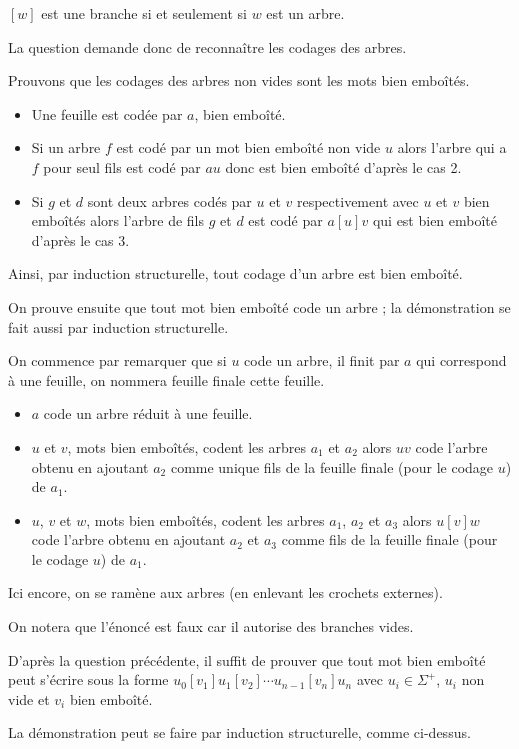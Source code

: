 \begin{Exercise}$[w]$ est une branche si et seulement si $w$ est un arbre.

La question demande donc de reconnaître les codages des arbres.

Prouvons que les codages des arbres non vides sont les mots bien emboîtés.

\begin{itemize}
    \item Une feuille est codée par $a$, bien emboîté.
    \item Si un arbre $f$ est codé par un mot bien emboîté non vide $u$ alors l'arbre qui a $f$ pour seul fils est codé par $au$ donc est bien emboîté d'après le cas 2.
    \item Si $g$ et $d$ sont deux arbres codés par $u$ et $v$ respectivement avec $u$ et $v$ bien emboîtés alors l'arbre de fils $g$ et $d$ est codé par $a[u]v$ qui est bien emboîté d'après le cas 3.
\end{itemize}

Ainsi, par induction structurelle, tout codage d'un arbre est bien emboîté.

\medskip

On prouve ensuite que tout mot bien emboîté code un arbre ; la démonstration se fait aussi par induction structurelle.

On commence par remarquer que si $u$ code un arbre, il finit par $a$ qui correspond à une feuille, on nommera feuille finale cette feuille.

\begin{itemize}
    \item $a$ code un arbre réduit à une feuille.
    \item $u$ et $v$, mots bien emboîtés, codent les arbres $a_1$ et $a_2$ alors $uv$ code l'arbre obtenu en ajoutant $a_2$ comme unique fils de la feuille finale (pour le codage $u$) de $a_1$.
    \item $u$, $v$ et $w$, mots bien emboîtés, codent les arbres $a_1$, $a_2$ et $a_3$ alors $u[v]w$ code l'arbre obtenu en ajoutant $a_2$ et $a_3$ comme fils de la feuille finale (pour le codage $u$) de $a_1$.
\end{itemize}
\end{Exercise}
\begin{Exercise}Ici encore, on se ramène aux arbres (en enlevant les crochets externes).

On notera que l'énoncé est faux car il autorise des branches vides.

D'après la question précédente, il suffit de prouver que tout mot bien emboîté peut s'écrire sous la forme
$u_0[v_1]u_1[v_2]\cdots u_{n-1}[v_n]u_n$ avec $u_i\in \Sigma^+$, $u_i$ non vide et $v_i$ bien emboîté.

La démonstration peut se faire par induction structurelle, comme ci-dessus.
\end{Exercise}
